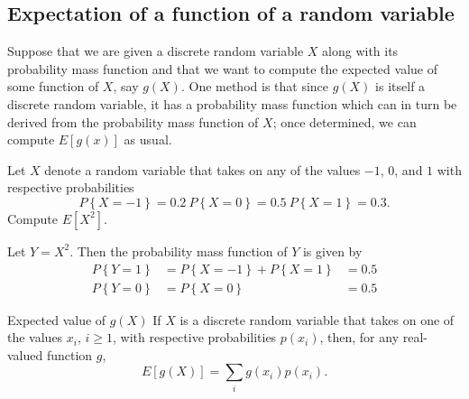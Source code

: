 \pagebreak
\subsection{Expectation of a function of a random variable}
Suppose that we are given a discrete random variable $X$ along with its probability mass function and that we want to compute the expected value of some function of $X$, say $g(X)$. One method is that since $g(X)$ is itself a discrete random variable, it has a probability mass function which can in turn be derived from the probability mass function of $X$; once determined, we can compute $E\left[ g(x) \right]$ as usual.
\begin{changebar}
    \begin{example}
        Let $X$ denote a random variable that takes on any of the values $-1$, $0$, and $1$ with respective probabilities \[
            P\left\{ X = -1 \right\} = 0.2 \: P\left\{ X = 0 \right\} = 0.5 \: P\left\{ X = 1 \right\} = 0.3.    
        \]
        Compute $E\left[ X^2 \right]$.
    \end{example}
    \begin{solution}
        Let $Y = X^2$. Then the probability mass function of $Y$ is given by \[
            \begin{aligned}
                P\left\{ Y = 1 \right\} &= P\left\{ X = -1 \right\} + P\left\{ X = 1 \right\} &= 0.5 \\
                P\left\{ Y = 0 \right\} &= P\left\{ X = 0 \right\} &= 0.5
            \end{aligned}    
        \]
    \end{solution}
\end{changebar}
\begin{bdef}{Expected value of $g(X)$}\label{expectedvaluegx}
    If $X$ is a discrete random variable that takes on one of the values $x_i$, $i \geq 1$, with respective probabilities $p(x_i)$, then, for any real-valued function $g$, \[
        E\left[ g(X) \right] = \sum_i g(x_i)p(x_i).    
    \]
\end{bdef}
